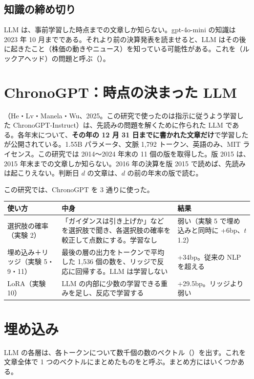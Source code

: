 \subsection{知識の締め切り}

LLM は、事前学習した時点までの文章しか知らない。gpt-4o-mini の知識は 2023 年 10 月までである。それより前の決算発表を読ませると、LLM はその後に起きたこと（株価の動きやニュース）を知っている可能性がある。これを（ルックアヘッド）の問題と呼ぶ（）。

\section{ChronoGPT：時点の決まった LLM}

（He・Lv・Manela・Wu、2025。この研究で使ったのは指示に従うよう学習した ChronoGPT-Instruct）は、先読みの問題を解くために作られた LLM である。各年末について、\textbf{その年の 12 月 31 日までに書かれた文章だけ}で学習したが公開されている。1.55B パラメータ、文脈 1,792 トークン、英語のみ、MIT ライセンス。この研究では 2014〜2024 年末の 11 個の版を取得した。版 2015 は、2015 年末までの文章しか知らない。2016 年の決算を版 2015 で読めば、先読みは起こりえない。判断日 $d$ の文章は、$d$ の前の年末の版で読む。

この研究では、ChronoGPT を 3 通りに使った。

\begin{longtable}{P{3.0cm}P{6.0cm}P{5.4cm}}
\toprule
\textbf{使い方} & \textbf{中身} & \textbf{結果} \\
\midrule
\endhead
\bottomrule
\endfoot
選択肢の確率（実験 2） & 「ガイダンスは引き上げか」などを選択肢で聞き、各選択肢の確率を較正して点数にする。学習なし & 弱い（実験 5 で埋め込みと同時に +6bp、$t$ 1.2） \\
埋め込み＋リッジ（実験 5・9・11） & 最後の層の出力をトークンで平均した 1,536 個の数を、リッジで反応に回帰する。LLM は学習しない & +34bp。従来の NLP を超える \\
LoRA（実験 10） & LLM の内部に少数の学習できる重みを足し、反応で学習する & +29.5bp。リッジより弱い \\
\end{longtable}

\section{埋め込み}

LLM の各層は、各トークンについて数千個の数のベクトル（）を出す。これを文章全体で 1 つのベクトルにまとめたものをと呼ぶ。まとめ方にはいくつかある。

